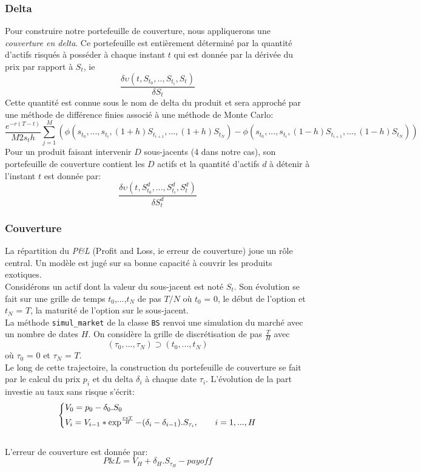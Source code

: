 \documentclass[french,12pt,a4paper]{article}
\begin{document}
\subsubsection{Delta}

Pour construire notre portefeuille de couverture, nous appliquerons une \textit{couverture en delta}. Ce portefeuille est entièrement déterminé par la quantité d'actifs risqués à posséder à chaque instant $t$ qui est donnée par la dérivée du prix par rapport à $S_{t}$, ie
$$ \frac{\delta\upsilon(t, S_{t_{0}},.., S_{t_{i}}, S_{t})}{\delta S_{t}} $$
Cette quantité est connue sous le nom de delta du produit et sera approché par une méthode de différence finies associé à une méthode de Monte Carlo:
$$ \frac{e^{-r(T-t)}}{M2s_{t}h}\sum_{j=1}^{M}(\phi(s_{t_{0}},...,s_{t_{i}},(1+h)S_{t_{i+1}},...,(1+h)S_{t_{N}})-\phi(s_{t_{0}},...,s_{t_{i}},(1-h)S_{t_{i+1}},...,(1-h)S_{t_{N}}))$$
Pour un produit faisant intervenir $D$ sous-jacents (4 dans notre cas), son portefeuille de couverture contient les $D$ actifs et la quantité d'actifs $d$ à détenir à l'instant $t$ est donnée par:
$$ \frac{\delta\upsilon(t, S_{t_{0}}^{d},...,S_{t_{i}}^{d},S_{t}^{d})}{\delta S_{t}^{d}} $$

\subsubsection{Couverture}

La répartition du \textit{P\&L} (Profit and Loss, ie erreur de couverture) joue un rôle central. Un modèle est jugé sur sa bonne capacité à couvrir les produits exotiques.\\
Considérons un actif dont la valeur du sous-jacent est noté $S_{t}$. Son évolution se fait sur une grille de temps {$t_{0}$,...,$t_{N}$} de pas $T/N$ où ${t_{0}}$ = $0$, le début de l'option et ${t_{N}}$ = $T$, la maturité de l'option sur le sous-jacent.\\
La méthode \lstinline!simul_market! de la classe \lstinline!BS! renvoi une simulation du marché avec un nombre de dates $H$. On considère la grille de discrétisation de pas $\frac{T}{H}$ avec
$$(\tau_{0},...,\tau_{N}) \supset (t_{0},...,t_{N})$$ 
où
 $\tau_{0}$ = $0$ et $\tau_{N}$ = $T$.\\
Le long de cette trajectoire, la construction du portefeuille de couverture se fait par le calcul du prix $p_{i}$ et du delta $\delta_{i}$ à chaque date $\tau_{i}$. L'évolution de la part investie au taux sans risque s'écrit:\\
$$
  \left\{%
     \vspace{-3ex}
        \begin{aligned}
          & V_{0} = p_{0}-\delta_{0}.S_{0} \\
          & V_{i} = V_{i-1}*\exp^{\frac{r*T}{H}}-(\delta_{i}-\delta_{i-1}).S_{\tau_{i}}, \hspace{7 mm}  i=1,...,H 
        \end{aligned}
 \right.
 $$
\\
L'erreur de couverture est donnée par:
 $$P\&L = V_{H}+\delta_{H}.S_{\tau_{H}}-payoff$$
\end{document}
